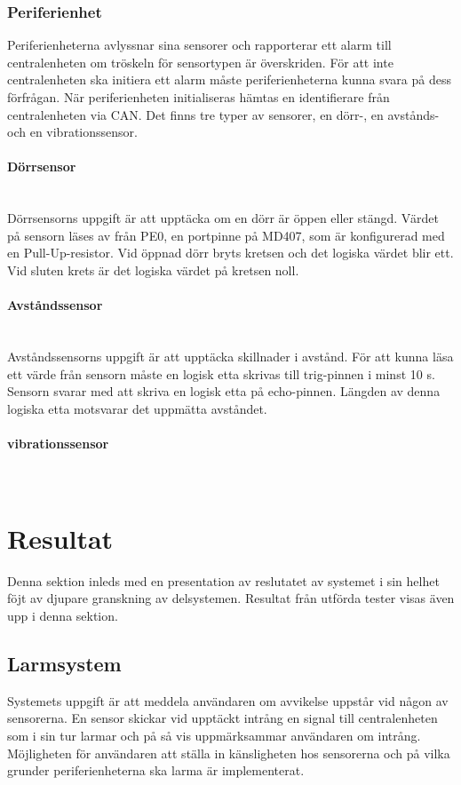 \documentclass[a4paper]{article}
\newcommand{\subsubsubsection}[1]{\paragraph{#1}\mbox{}\\}
\begin{document}

\subsubsection{Periferienhet}
Periferienheterna avlyssnar sina sensorer och rapporterar ett alarm till centralenheten om tröskeln för sensortypen är överskriden.
För att inte centralenheten ska initiera ett alarm måste periferienheterna kunna svara på dess förfrågan.
När periferienheten initialiseras hämtas en identifierare från centralenheten via CAN. Det finns tre typer av sensorer, en dörr-, en avstånds- och en vibrationssensor.

\subsubsubsection{Dörrsensor}
Dörrsensorns uppgift är att upptäcka om en dörr är öppen eller stängd. Värdet på sensorn läses av från PE0, en portpinne på MD407, som är konfigurerad med en Pull-Up-resistor. Vid öppnad dörr bryts kretsen och det logiska värdet blir ett. Vid sluten krets är det logiska värdet på kretsen noll.

\subsubsubsection{Avståndssensor}
Avståndssensorns uppgift är att upptäcka skillnader i avstånd.
För att kunna läsa ett värde från sensorn måste en logisk etta skrivas till trig-pinnen i minst 10 \textmu s.
Sensorn svarar med att skriva en logisk etta på echo-pinnen.
Längden av denna logiska etta motsvarar det uppmätta avståndet.

\subsubsubsection{vibrationssensor}

\section{Resultat}
Denna sektion inleds med en presentation av reslutatet av systemet i sin helhet föjt av djupare granskning av delsystemen. Resultat från utförda tester visas även upp i denna sektion.

\subsection{Larmsystem}
Systemets uppgift är att meddela användaren om avvikelse uppstår vid någon av sensorerna. En sensor skickar vid upptäckt intrång en signal till centralenheten som i sin tur larmar och på så vis uppmärksammar användaren om intrång. Möjligheten för användaren att ställa in känsligheten hos sensorerna och på vilka grunder periferienheterna ska larma är implementerat.
\end{document}
